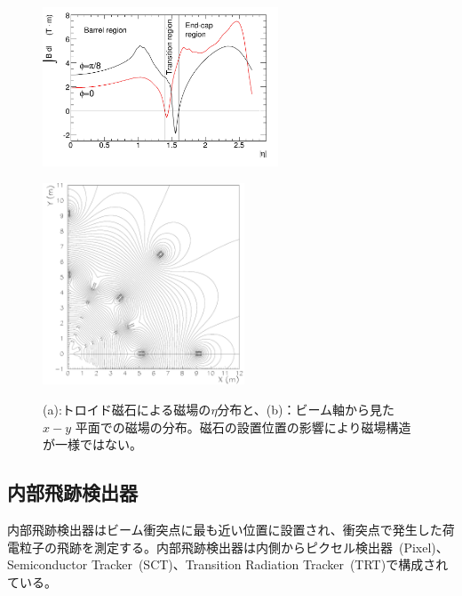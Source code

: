 \begin{figure}
    \centering
    \begin{minipage}[b]{0.4\linewidth}
        \centering
        \includegraphics[clip, width=7cm]{fig/2/IBdl.pdf}
        \vspace{10pt}
        \subcaption{}
        \label{fig:磁場eta}
    \end{minipage}
    \hfill
    \begin{minipage}[b]{0.5\linewidth}
        \centering
        \includegraphics[clip, width=6cm]{fig/2/FMBmap.pdf}
        \vspace{10pt}
        \subcaption{}
        \label{fig:磁場平面}
    \end{minipage}
    \caption{(a):トロイド磁石による磁場の$\eta$分布\cite{Aad:1129811}と、(b)：ビーム軸から見た $x − y$ 平面での磁場の分布\cite{article:ATLASMagneticField}。磁石の設置位置の影響により磁場構造が一様ではない。}
    \label{fig:磁場}
\end{figure}




\subsection{内部飛跡検出器}
内部飛跡検出器はビーム衝突点に最も近い位置に設置され、衝突点で発生した荷電粒子の飛跡を測定する。内部飛跡検出器は内側からピクセル検出器~(Pixel)、Semiconductor Tracker~(SCT)、Transition Radiation Tracker~(TRT)で構成されている。

